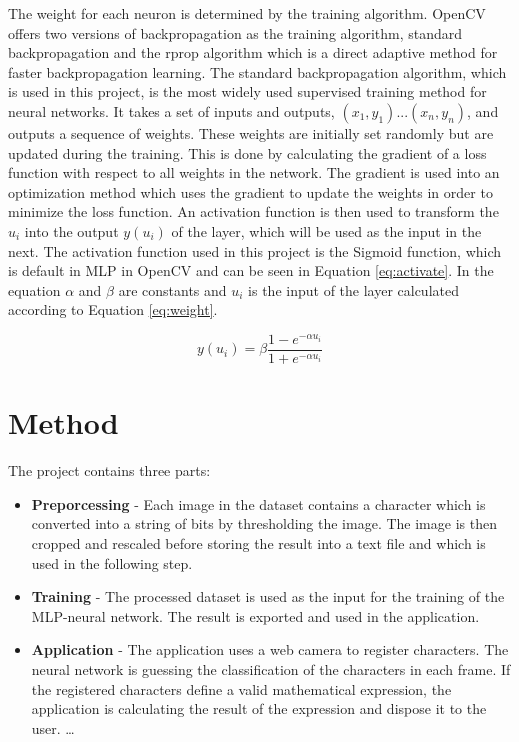 \documentclass[12pt]{report}
\begin{document}
The weight for each neuron is determined by the training algorithm. OpenCV offers two versions of backpropagation as the training algorithm, standard backpropagation and the rprop algorithm which is a direct adaptive method for faster backpropagation learning. The standard backpropagation algorithm, which is used in this project, is the most widely used supervised training method for neural networks. It takes a set of inputs and outputs, $(x_1, y_1)...(x_n,y_n)$, and outputs a sequence of weights. These weights are initially set randomly but are updated during the training. This is done by calculating the gradient of a loss function with respect to all weights in the network. The gradient is used into an optimization method which uses the gradient to update the weights in order to minimize the loss function. 
\newline
\newline
An activation function is then used to transform the $u_{i}$ into the output $y(u_{i})$  of the layer, which will be used as the input in the next. The activation function used in this project is the Sigmoid function, which is default in MLP in OpenCV and can be seen in Equation \ref{eq:activate}. In the equation $\alpha$ and $\beta$ are constants and $u_{i}$ is the input of the layer calculated according to Equation \ref{eq:weight}.


\begin{equation}
  \label{eq:activate}
  y(u_{i})= \beta \frac{1 - e^{-\alpha u_{i}}}{1 + e^{-\alpha u_{i}}}
\end{equation}



\section*{Method}

The project contains three parts:

\begin{itemize}  
\item \textbf{Preporcessing} -  Each image in the dataset contains a character which is converted into a string of bits by thresholding the image. The image is then cropped and rescaled before storing the result into a text file and which is used in the following step. 
\item \textbf{Training} - The processed dataset is used as the input for the training of the MLP-neural network. The result is exported and used in the application.
\item \textbf{Application} - The application uses a web camera to register characters. The neural network is guessing the classification of the characters in each frame. If the registered characters define a valid mathematical expression, the application is calculating the result of the expression and dispose it to the user. \ldots 
\end{itemize}
\end{document}

